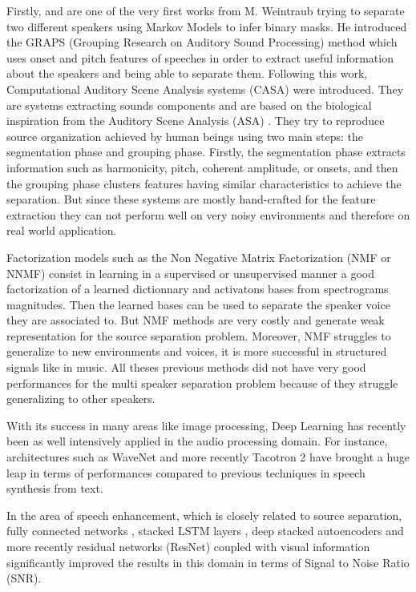 \documentclass[master, tikz, final,11pt, dvipdfmx]{iscs-thesis}
\begin{document}
Firstly, \cite{Weintraub:1985:TCM:912498} and \cite{ GRAPS} are one of the very first works from M. Weintraub trying to separate two different speakers using Markov Models to infer binary masks. He introduced the GRAPS (Grouping Research on Auditory Sound Processing) method which uses onset and pitch features of speeches in order to extract useful information about the speakers and being able to separate them.
Following this work, Computational Auditory Scene Analysis systems (CASA) \cite{CASA1, CASA2} were introduced. They are systems extracting sounds components and are based on the biological inspiration from the Auditory Scene Analysis (ASA) \cite{ASA}. They try to reproduce source organization achieved by human beings using two main steps: the segmentation phase and grouping phase. Firstly, the segmentation phase extracts information such as harmonicity, pitch, coherent amplitude, or onsets, and then the grouping phase clusters features having similar characteristics to achieve the separation. But since these systems are mostly hand-crafted for the feature extraction they can not perform well on very noisy environments and therefore on real world application. 

Factorization models such as the Non Negative Matrix Factorization \cite{SNMF, NMFalgo} (NMF or NNMF) consist in learning in a supervised or unsupervised manner a good factorization of a learned dictionnary and activatons bases from spectrograms magnitudes. Then the learned bases can be used to separate the speaker voice they are associated to. But NMF methods are very costly and generate weak representation for the source separation problem. Moreover, NMF struggles to generalize to new environments and voices, it is more successful in structured signals like in music.
All theses previous methods did not have very good performances for the multi speaker separation problem because of they struggle generalizing to other speakers.

With its success in many areas like image processing, Deep Learning has recently been as well intensively applied in the audio processing domain. For instance, architectures such as WaveNet \cite{WaveNet} and more recently Tacotron 2 \cite{Tacotron2} have brought a huge leap in terms of performances compared to previous techniques in speech synthesis from text.

In the area of speech enhancement, which is closely related to source separation, fully connected networks \cite{DLSS}, stacked LSTM layers \cite{SELSTM, DAVSE}, deep stacked autoencoders \cite{AESE} and more recently residual networks (ResNet) coupled with visual information \cite{SpeechEnh} significantly improved the results in this domain in terms of Signal to Noise Ratio (SNR).
\end{document}

